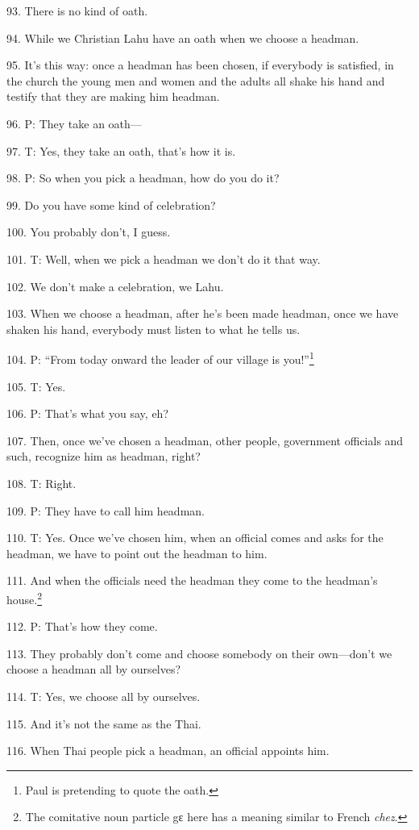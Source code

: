 93. There is no kind of oath.

94. While we Christian Lahu have an oath when we choose a headman.

95. It's this way: once a headman has been chosen, if everybody is satisfied, in
the church the young men and women and the adults all shake his hand and testify
that they are making him headman.

96. P: They take an oath---

97. T: Yes, they take an oath, that's how it is.

98. P: So when you pick a headman, how do you do it?

99. Do you have some kind of celebration?

100. You probably don't, I guess.

101. T: Well, when we pick a headman we don't do it that way.

102. We don't make a celebration, we Lahu.

103. When we choose a headman, after he's been made headman, once we have shaken
his hand, everybody must listen to what he tells us.

104. P: ``From today onward the leader of our village is you!''\footnote{Paul is pretending to quote the oath.}

105. T: Yes.

106. P: That's what you say, eh?

107. Then, once we've chosen a headman, other people, government officials and
such, recognize him as headman, right?

108. T: Right.

109. P: They have to call him headman.

110. T: Yes. Once we've chosen him, when an official comes and asks for the headman,
we have to point out the headman to him.

111. And when the officials need the headman they come to the headman's house.\footnote{The comitative noun particle gɛ here has a meaning similar to French \textit{chez}.}

112. P: That's how they come.

113. They probably don't come and choose somebody on their own---don't we choose
a headman all by ourselves?

114. T: Yes, we choose all by ourselves.

115. And it's not the same as the Thai.

116. When Thai people pick a headman, an official appoints him.

